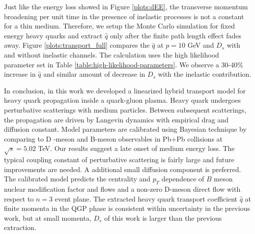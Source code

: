 \documentclass[aps, prc, reprint, amsmath, groupedaddress, nofootinbib]{revtex4-1}
\begin{document}
Just like the energy loss showed in Figure \ref{plots:dEE}, the transverse momentum broadening per unit time in the presence of inelastic processes is not a constant for a thin medium.
Therefore, we setup the Monte Carlo simulation for fixed energy heavy quarks and extract $\hat{q}$ only after the finite path length effect fades away. 
Figure \ref{plots:transport_full} compares the $\hat{q}$ at $p=10$ GeV and $D_s$ with and without inelastic channels.
The calculation uses the high likelihood parameter set in Table \ref{table:high-likelihood-parameters}. 
We observe a 30-40\% increase in $\hat{q}$ and similar amount of decrease in $D_s$ with the inelastic contribution.

In conclusion, in this work we developed a linearized hybrid transport model for heavy quark propagation inside a quark-gluon plasma.
Heavy quark undergoes perturbative scatterings with medium particles. Between subsequent scatterings, the propagation are driven by Langevin dynamics with empirical drag and diffusion constant.
Model parameters are calibrated using Bayesian technique by comparing to D -meson and B-meson observables in Pb+Pb collisions at $\sqrt{s}=5.02$ TeV.
Our results suggest a late onset of medium energy loss.
The typical coupling constant of perturbative scattering is fairly large and future improvements are needed.
A additional small diffusion component is preferred.
The calibrated model predicts the centrality and $p_T$ dependence of $B$ meson nuclear modification factor and flows and a non-zero D-meson direct flow with respect to $n=3$ event plane.
The extracted heavy quark transport coefficient $\hat{q}$ at finite momenta in the QGP phase is consistent within uncertainty in the previous work, but at small momenta, $D_s$ of this work is larger than the previous extraction.
\end{document}

